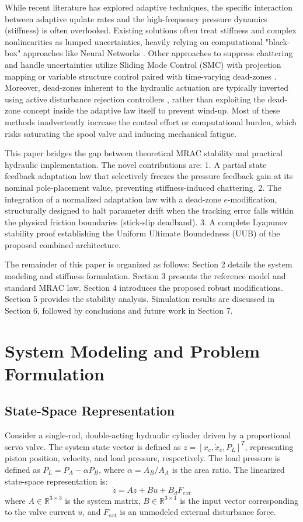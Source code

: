 \documentclass[12pt,a4paper]{article}
\begin{document}
While recent literature has explored adaptive techniques, the specific interaction between adaptive update rates and the high-frequency pressure dynamics (stiffness) is often overlooked. Existing solutions often treat stiffness and complex nonlinearities as lumped uncertainties, heavily relying on computational "black-box" approaches like Neural Networks \cite{Yao2019}. Other approaches to suppress chattering and handle uncertainties utilize Sliding Mode Control (SMC) with projection mapping \cite{Yang2019} or variable structure control paired with time-varying dead-zones \cite{Hwang1999}. Moreover, dead-zones inherent to the hydraulic actuation are typically inverted using active disturbance rejection controllers \cite{Wang2020}, rather than exploiting the dead-zone concept inside the adaptive law itself to prevent wind-up. Most of these methods inadvertently increase the control effort or computational burden, which risks saturating the spool valve and inducing mechanical fatigue.

This paper bridges the gap between theoretical MRAC stability and practical hydraulic implementation. The novel contributions are:
1. A partial state feedback adaptation law that selectively freezes the pressure feedback gain at its nominal pole-placement value, preventing stiffness-induced chattering.
2. The integration of a normalized adaptation law with a dead-zone $e$-modification, structurally designed to halt parameter drift when the tracking error falls within the physical friction boundaries (stick-slip deadband).
3. A complete Lyapunov stability proof establishing the Uniform Ultimate Boundedness (UUB) of the proposed combined architecture.

The remainder of this paper is organized as follows: Section 2 details the system modeling and stiffness formulation. Section 3 presents the reference model and standard MRAC law. Section 4 introduces the proposed robust modifications. Section 5 provides the stability analysis. Simulation results are discussed in Section 6, followed by conclusions and future work in Section 7.

\section{System Modeling and Problem Formulation}
\subsection{State-Space Representation}
Consider a single-rod, double-acting hydraulic cylinder driven by a proportional servo valve. The system state vector is defined as $z = [x_c, \dot{x}_c, P_L]^T$, representing piston position, velocity, and load pressure, respectively. The load pressure is defined as $P_L = P_A - \alpha P_B$, where $\alpha = A_B / A_A$ is the area ratio.
The linearized state-space representation is:
\begin{equation}
    \dot{z} = A z + B u + B_d F_{ext}
\end{equation}
where $A \in \mathbb{R}^{3\times 3}$ is the system matrix, $B \in \mathbb{R}^{3\times 1}$ is the input vector corresponding to the valve current $u$, and $F_{ext}$ is an unmodeled external disturbance force.
\end{document}
